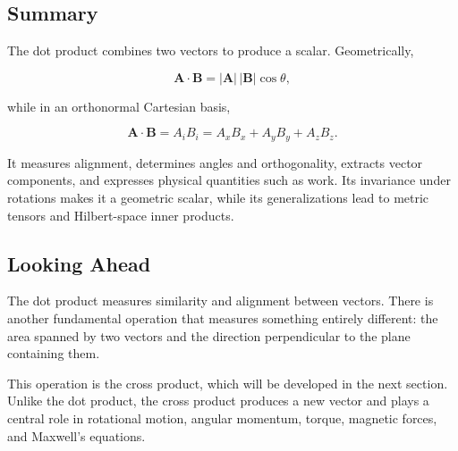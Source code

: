 \subsection{Summary}

The dot product combines two vectors to produce a scalar. Geometrically,

\[
\mathbf A\cdot\mathbf B
=
\lvert\mathbf A\rvert\,\lvert\mathbf B\rvert\cos\theta,
\]

while in an orthonormal Cartesian basis,

\[
\mathbf A\cdot\mathbf B
=
A_iB_i
=
A_xB_x+A_yB_y+A_zB_z.
\]

It measures alignment, determines angles and orthogonality, extracts vector
components, and expresses physical quantities such as work. Its invariance
under rotations makes it a geometric scalar, while its generalizations lead to
metric tensors and Hilbert-space inner products.

\subsection{Looking Ahead}

The dot product measures similarity and alignment between vectors. There is
another fundamental operation that measures something entirely different: the
area spanned by two vectors and the direction perpendicular to the plane
containing them.

This operation is the cross product, which will be developed in the next
section. Unlike the dot product, the cross product produces a new vector and
plays a central role in rotational motion, angular momentum, torque, magnetic
forces, and Maxwell's equations.

